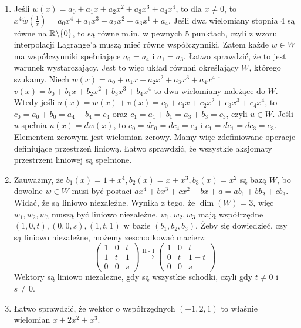 \documentclass{../note}
\begin{document}
\begin{rozwiazanie}
\begin{enumerate}[label=(\alph*)]
    \item Jeśli $w(x)=a_{0}+a_{1}x+a_{2}x^{2}+a_{3}x^{3}+a_{4}x^{4}$, to dla $x \neq 0$, to $x^4 \tilde{w}\left(\frac1x\right) = a_{0}x^4+a_{1}x^3+a_{2}x^{2}+a_{3}x^{1}+a_{4}$. Jeśli dwa wielomiany stopnia 4 są równe na $\mathbb{R} \backslash \{0\}$, to są równe m.in. w pewnych 5 punktach, czyli z wzoru interpolacji Lagrange'a muszą mieć równe współczynniki. Zatem każde $w \in W$ ma współczynniki spełniające $a_0 = a_4$ i $a_1 = a_3$. Łatwo sprawdzić, że to jest warunek wystarczający. Jest to więc układ równań określający $W$, którego szukamy. Niech $w(x)=a_{0}+a_{1}x+a_{2}x^{2}+a_{3}x^{3}+a_{4}x^{4}$ i $v(x)=b_{0}+b_{1}x+b_{2}x^{2}+b_{3}x^{3}+b_{4}x^{4}$ to dwa wielomiany należące do $W$. Wtedy jeśli $u(x) = w(x) + v(x) =c_{0}+c_{1}x+c_{2}x^{2}+c_{3}x^{3}+c_{4}x^{4}$, to $c_0 = a_0 + b_0 = a_4 + b_4 = c_4$ oraz $c_1 = a_1 + b_1 = a_3 + b_3 = c_3$, czyli $u \in W$. Jeśli $u$ spełnia $u(x) = dw(x)$, to $c_0 = dc_0 = dc_4 = c_4$ i $c_1 = dc_1 = dc_3 = c_3$. Elementem zerowym jest wielomian zerowy. Mamy więc zdefiniowane operacje definiujące przestrzeń liniową. Łatwo sprawdzić, że wszystkie aksjomaty przestrzeni liniowej są spełnione.
    \item Zauważmy, że $b_1(x) = 1 + x^4, b_2(x) = x + x^3, b_3(x) = x^2$ są bazą $W$, bo dowolne $w \in W$ musi być postaci $ax^4 + bx^3 + cx^2 + bx + a = ab_1 + bb_2 + cb_3$. Widać, że są liniowo niezależne. Wynika z tego, że $\dim(W) = 3$, więc $w_1, w_2, w_3$ muszą być liniowo niezależne. $w_1, w_2, w_3$ mają współrzędne $(1, 0, t), (0, 0, s), (1, t, 1)$ w bazie $(b_1, b_2, b_3)$. Żeby się dowiedzieć, czy są liniowo niezależne, możemy zeschodkować macierz:
    \[
    \begin{pmatrix}
        1 & 0 & t \\
        1 & t & 1 \\
        0 & 0 & s
    \end{pmatrix} \xrightarrow{\text{II - I}}
    \begin{pmatrix}
        1 & 0 & t \\
        0 & t & 1 - t \\
        0 & 0 & s
    \end{pmatrix}
    \]
    Wektory są liniowo niezależne, gdy są wszystkie schodki, czyli gdy $t \neq 0$ i $s \neq 0$.
    \item Łatwo sprawdzić, że wektor o współrzędnych $(-1, 2, 1)$ to właśnie wielomian $x+2x^{2}+x^{3}$.
\end{enumerate}
\end{rozwiazanie}
\end{document}
